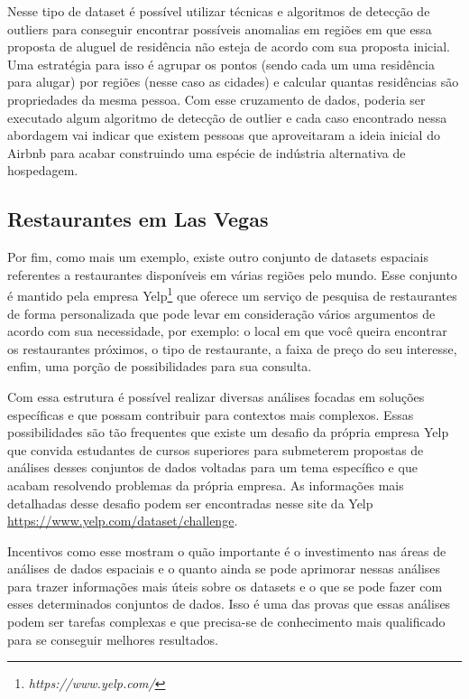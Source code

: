 Nesse tipo de dataset é possível utilizar técnicas e algoritmos de detecção de outliers para conseguir encontrar possíveis anomalias em regiões em que essa proposta de aluguel de residência não esteja de acordo com sua proposta inicial. Uma estratégia para isso é agrupar os pontos (sendo cada um uma residência para alugar) por regiões (nesse caso as cidades) e calcular quantas residências são propriedades da mesma pessoa. Com esse cruzamento de dados, poderia ser executado algum algoritmo de detecção de outlier e cada caso encontrado nessa abordagem vai indicar que existem pessoas que aproveitaram a ideia inicial do Airbnb para acabar construindo uma espécie de indústria alternativa de hospedagem.

\subsection{Restaurantes em Las Vegas}

Por fim, como mais um exemplo, existe outro conjunto de datasets espaciais referentes a restaurantes disponíveis em várias regiões pelo mundo. Esse conjunto é mantido pela empresa Yelp\footnote{\it https://www.yelp.com/} que oferece um serviço de pesquisa de restaurantes de forma personalizada que pode levar em consideração vários argumentos de acordo com sua necessidade, por exemplo: o local em que você queira encontrar os restaurantes próximos, o tipo de restaurante, a faixa de preço do seu interesse, enfim, uma porção de possibilidades para sua consulta.

Com essa estrutura é possível realizar diversas análises focadas em soluções específicas e que possam contribuir para contextos mais complexos. Essas possibilidades são tão frequentes que existe um desafio da própria empresa Yelp que convida estudantes de cursos superiores para submeterem propostas de análises desses conjuntos de dados voltadas para um tema específico e que acabam resolvendo problemas da própria empresa. As informações mais detalhadas desse desafio podem ser encontradas nesse site da Yelp \url{https://www.yelp.com/dataset/challenge}.

Incentivos como esse mostram o quão importante é o investimento nas áreas de análises de dados espaciais e o quanto ainda se pode aprimorar nessas análises para trazer informações mais úteis sobre os datasets e o que se pode fazer com esses determinados conjuntos de dados. Isso é uma das provas que essas análises podem ser tarefas complexas e que precisa-se de conhecimento mais qualificado para se conseguir melhores resultados.

